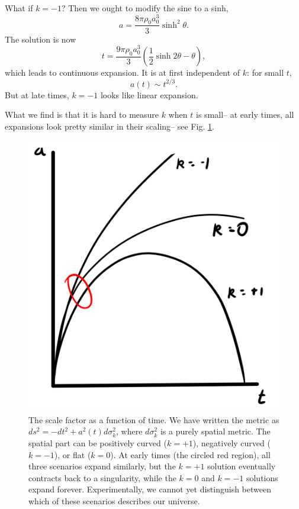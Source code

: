 What if $k=-1$? Then we ought to modify the sine to a sinh, $$a=\frac{8\pi\rho_0 a_0^3}{3}\sinh^2 \theta.$$
The solution is now
$$t=\frac{9\pi\rho_0 a_0^3}{3}(\frac{1}{2}\sinh 2\theta -\theta),$$
which leads to continuous expansion. It is at first independent of $k$: for small $t$,
$$a(t)\sim t^{2/3}.$$
But at late times, $k=-1$ looks like linear expansion.

What we find is that it is hard to measure $k$ when $t$ is small-- at early times, all expansions look pretty similar in their scaling-- see Fig. \ref{fig:flrw_metric}.

\begin{figure}
    \centering
    \includegraphics{2018/11/20181114_scalefactor.png}
    \caption{The scale factor as a function of time. We have written the metric as $ds^2=-dt^2 +a^2(t) d\sigma_k^2$, where $d\sigma_k^2$ is a purely spatial metric. The spatial part can be positively curved ($k=+1$), negatively curved ($k=-1$), or flat ($k=0$). At early times (the circled red region), all three scenarios expand similarly, but the $k=+1$ solution eventually contracts back to a singularity, while the $k=0$ and $k=-1$ solutions expand forever. Experimentally, we cannot yet distinguish between which of these scenarios describes our universe.}
    \label{fig:flrw_metric}
\end{figure}

